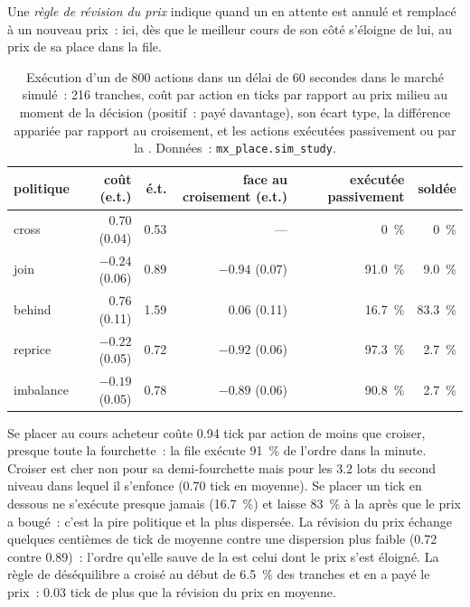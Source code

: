 \begin{definition}\label{def:mx:child-order-placement:reprice}
Une \emph{règle de révision du prix} indique quand un  en attente est annulé et remplacé à un nouveau prix~: ici, dès que le
meilleur cours de son côté s'éloigne de lui, au prix de sa place dans la file.
\end{definition}

\begin{table}[ht]
\centering
\small
\begin{tabular}{@{}lrrrrr@{}}
\toprule
politique & coût (e.t.) & é.t. & face au croisement (e.t.) & exécutée passivement & soldée \\
\midrule
cross & 0.70 (0.04) & 0.53 & --- & 0~\% & 0~\% \\
join & $-0.24$ (0.06) & 0.89 & $-0.94$ (0.07) & 91.0~\% & 9.0~\% \\
behind & 0.76 (0.11) & 1.59 & 0.06 (0.11) & 16.7~\% & 83.3~\% \\
reprice & $-0.22$ (0.05) & 0.72 & $-0.92$ (0.06) & 97.3~\% & 2.7~\% \\
imbalance & $-0.19$ (0.05) & 0.78 & $-0.89$ (0.06) & 90.8~\% & 2.7~\% \\
\bottomrule
\end{tabular}
\caption{Exécution d'un  de 800 actions dans un délai de 60 secondes dans le marché simulé~: 216 tranches, coût par action en ticks par rapport au prix milieu au moment de la décision (positif~: payé davantage),
son écart type, la différence appariée par rapport au croisement, et les actions exécutées passivement ou par la .
Données~: \texttt{mx\_place.sim\_study}.}\label{tab:mx:child-order-placement:policies}
\end{table}

Se placer au cours acheteur coûte 0.94 tick par action de moins que croiser, presque toute la fourchette~: la file exécute 91~\% de l'ordre dans la minute. Croiser est cher non pour sa demi-fourchette
mais pour les 3.2 lots du second niveau dans lequel il s'enfonce (0.70 tick en moyenne). Se placer un tick en dessous ne s'exécute presque jamais
(16.7~\%) et laisse 83~\% à la  après que le prix a bougé~: c'est la pire politique et la plus dispersée. La révision du prix échange quelques
centièmes de tick de moyenne contre une dispersion plus faible (0.72 contre 0.89)~: l'ordre qu'elle sauve de la  est celui dont le prix s'est éloigné.
La règle de déséquilibre a croisé au début de 6.5~\% des tranches et en a payé le prix~: 0.03 tick de plus que la révision du prix en moyenne.

